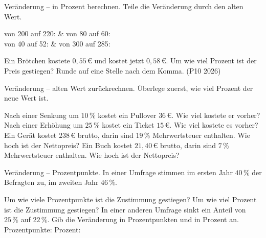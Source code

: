 \begin{aufgabe}{Veränderung – in Prozent berechnen. Teile die Veränderung durch den alten Wert.}
\begin{teilezwei}
\tz von 200 auf 220: \leerfeld[\%] & \tz von 80 auf 60: \leerfeld[\%] \\
\tz von 40 auf 52: \leerfeld[\%] & \tz von 300 auf 285: \leerfeld[\%] \\
\end{teilezwei}
\begin{teile}
\teil Ein Brötchen kostete $0{,}55\,€$ und kostet jetzt $0{,}58\,€$. Um wie viel Prozent ist der Preis gestiegen? Runde auf eine Stelle nach dem Komma. \hfill (P10 2026) \\ \leerfeld[\%]
\end{teile}
\end{aufgabe}

\begin{aufgabe}{Veränderung – alten Wert zurückrechnen. Überlege zuerst, wie viel Prozent der neue Wert ist.}
\begin{teile}
\teil Nach einer Senkung um $10\,\%$ kostet ein Pullover $36\,€$. Wie viel kostete er vorher? \leerfeld[€]
\teil Nach einer Erhöhung um $25\,\%$ kostet ein Ticket $15\,€$. Wie viel kostete es vorher? \leerfeld[€]
\teil Ein Gerät kostet $238\,€$ brutto, darin sind $19\,\%$ Mehrwertsteuer enthalten. Wie hoch ist der Nettopreis? \leerfeld[€]
\teil Ein Buch kostet $21{,}40\,€$ brutto, darin sind $7\,\%$ Mehrwertsteuer enthalten. Wie hoch ist der Nettopreis? \leerfeld[€]
\end{teile}
\end{aufgabe}

\begin{aufgabe}{Veränderung – Prozentpunkte. In einer Umfrage stimmen im ersten Jahr $40\,\%$ der Befragten zu, im zweiten Jahr $46\,\%$.}
\begin{teile}
\teil Um wie viele Prozentpunkte ist die Zustimmung gestiegen? \leerfeld
\teil Um wie viel Prozent ist die Zustimmung gestiegen? \leerfeld[\%]
\teil In einer anderen Umfrage sinkt ein Anteil von $25\,\%$ auf $22\,\%$. Gib die Veränderung in Prozentpunkten und in Prozent an. \\ Prozentpunkte: \leerfeld \quad Prozent: \leerfeld[\%]
\end{teile}
\end{aufgabe}

